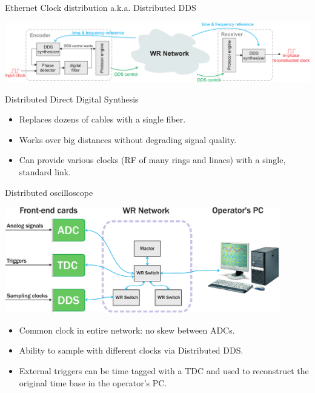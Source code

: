 \documentclass[compress, red]{beamer}
\begin{document}
\begin{frame}{Ethernet Clock distribution a.k.a. Distributed DDS}
  \begin{center}
    \includegraphics[width=\columnwidth]{../../figures/applications/remote_dds.pdf}
  \end{center}
  \begin{block}{Distributed Direct Digital Synthesis}
    \begin{itemize}
    \item Replaces dozens of cables with a single fiber.
    \item Works over big distances without degrading signal quality.
    \item Can provide various clocks (RF of many rings and linacs)
      with a single, standard link.
    \end{itemize}
  \end{block}
\end{frame}

\begin{frame}{Distributed oscilloscope}
 \begin{center}
   \includegraphics[width=0.9\textwidth]{../../figures/applications/distr_oscill.pdf}
   \end{center}
   \begin{block}{}
     \begin{itemize}
     \item Common clock in entire network: no skew between ADCs.
     \item Ability to sample with different clocks via Distributed DDS.
     \item External triggers can be time tagged with a TDC and used to reconstruct the original time base in the operator's 
PC.
     \end{itemize}
   \end{block}
\end{frame}
\end{document}
